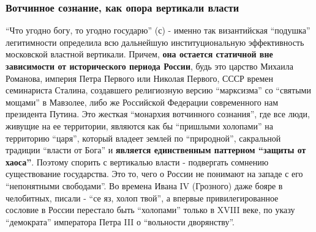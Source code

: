 
 
 
 
 

\subsubsection{Вотчинное сознание, как опора вертикали власти}
\label{sec:16_01_2022.stz.news.ua.hvylya.1.anatomia_vraga.5.votchinnoje_soznanie}

\enquote{Что угодно богу, то угодно государю} (с) - именно так византийская \enquote{подушка}
легитимности определила всю дальнейшую институциональную эффективность
московской властной вертикали. Причем, \textbf{она остается статичной вне зависимости
от исторического периода России}, будь это царство Михаила Романова, империя
Петра Первого или Николая Первого, СССР времен семинариста Сталина, создавшего
религиозную версию \enquote{марксизма} со \enquote{святыми мощами} в Мавзолее, либо же
Российской Федерации современного нам президента Путина. Это жесткая \enquote{монархия
вотчинного сознания}, где все люди, живущие на ее территории, являются как бы
\enquote{пришлыми холопами} на территорию \enquote{царя}, который владеет землей по
\enquote{природной}, сакральной традиции \enquote{власти от Бога} и \textbf{является единственным
паттерном \enquote{защиты от хаоса}}. Поэтому спорить с вертикалью власти - подвергать
сомнению существование государства. Это то, чего о России не понимают на западе
с его \enquote{непонятными свободами}. Во времена Ивана IV (Грозного) даже бояре в
челобитных, писали - \enquote{се яз, холоп твой}, а впервые привилегированное сословие
в России перестало быть \enquote{холопами} только в XVIII веке, по указу \enquote{демократа}
императора Петра III о \enquote{вольности дворянству}.

